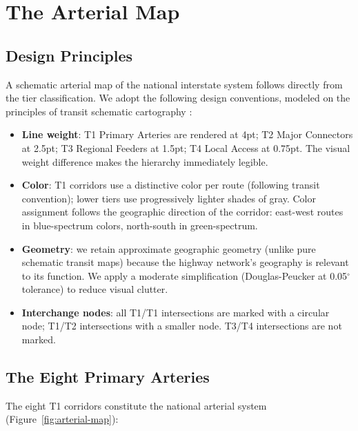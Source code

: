 \section{The Arterial Map}

\subsection{Design Principles}

A schematic arterial map of the national interstate system follows directly from the tier classification. We adopt the following design conventions, modeled on the principles of transit schematic cartography \citep{Ovenden2015}:

\begin{itemize}
\item \textbf{Line weight}: T1 Primary Arteries are rendered at 4pt; T2 Major Connectors at 2.5pt; T3 Regional Feeders at 1.5pt; T4 Local Access at 0.75pt. The visual weight difference makes the hierarchy immediately legible.
\item \textbf{Color}: T1 corridors use a distinctive color per route (following transit convention); lower tiers use progressively lighter shades of gray. Color assignment follows the geographic direction of the corridor: east-west routes in blue-spectrum colors, north-south in green-spectrum.
\item \textbf{Geometry}: we retain approximate geographic geometry (unlike pure schematic transit maps) because the highway network's geography is relevant to its function. We apply a moderate simplification (Douglas-Peucker at 0.05$^\circ$ tolerance) to reduce visual clutter.
\item \textbf{Interchange nodes}: all T1/T1 intersections are marked with a circular node; T1/T2 intersections with a smaller node. T3/T4 intersections are not marked.
\end{itemize}

\subsection{The Eight Primary Arteries}

The eight T1 corridors constitute the national arterial system (Figure~\ref{fig:arterial-map}):

